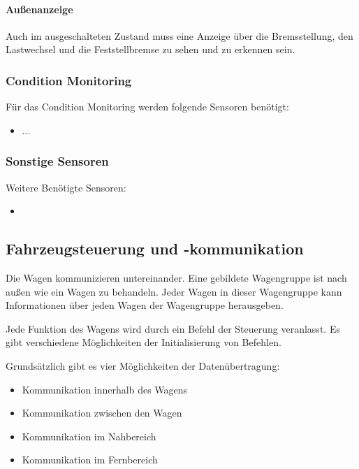 \paragraph{Außenanzeige}
\begin{feat}
Auch im ausgeschalteten Zustand muss eine Anzeige über die Bremsstellung, den Lastwechsel und die Feststellbremse zu sehen und zu erkennen sein.
\end{feat}

\subsubsection{Condition Monitoring}
\begin{feat}
Für das Condition Monitoring werden folgende Sensoren benötigt:
\begin{itemize}
    \item ...
\end{itemize}
\end{feat}

\subsubsection{Sonstige Sensoren}
\begin{feat}
Weitere Benötigte Sensoren:
\begin{itemize}
    \item 
\end{itemize}
\end{feat}


 \subsection{Fahrzeugsteuerung und -kommunikation}
Die Wagen kommunizieren untereinander. Eine gebildete Wagengruppe ist nach außen wie ein Wagen zu behandeln. Jeder Wagen in dieser Wagengruppe kann Informationen über jeden Wagen der Wagengruppe herausgeben.\par
Jede Funktion des Wagens wird durch ein Befehl der Steuerung veranlasst. Es gibt verschiedene Möglichkeiten der Initialisierung von Befehlen.\par
Grundsätzlich gibt es vier Möglichkeiten der Datenübertragung:
\begin{itemize}
    \item Kommunikation innerhalb des Wagens
    \item Kommunikation zwischen den Wagen
    \item Kommunikation im Nahbereich
    \item Kommunikation im Fernbereich
\end{itemize}

